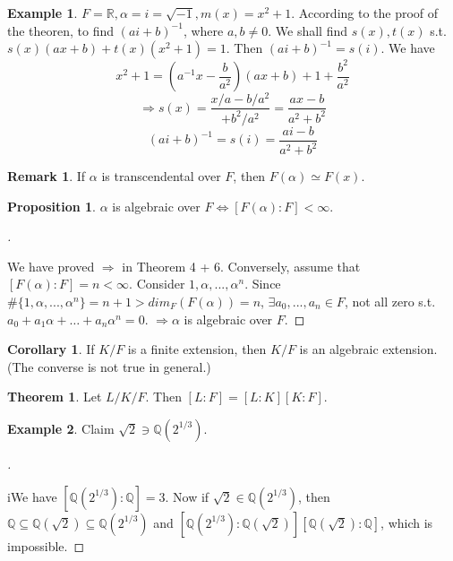 \documentclass{article}
\theoremstyle{definition}
\newtheorem{thm}{Theorem}
\newtheorem{ex}{Example}
\newtheorem{rem}{Remark}
\newtheorem{cor}{Corollary}
\newtheorem{prop}{Proposition}
\newenvironment{proofs}[1][\proofname]{%
  \begin{proof}[#1]$ $\par\nobreak\ignorespaces
}{%
  \end{proof}
}
\begin{document}
\begin{ex}
	$F = \mathbb{R}, \alpha = i = \sqrt{-1}, m(x) = x^2 + 1$.
	According to the proof of the theoren, to find $(ai + b)^{-1}$, where $a, b \neq 0$.
	We shall find $s(x), t(x)$ s.t. $s(x) (ax + b) + t(x) (x^2 + 1) = 1$.
	Then $(ai + b)^{-1} = s(i)$.
	We have
	\[
		x^2 + 1 = (a^{-1} x - \frac{b}{a^2})(ax + b) + 1 + \frac{b^2}{a^2}
	\]
	\[
		\Rightarrow s(x) = \frac{x/a - b/a^2}{ + b^2/a^2} = \frac{ax - b}{a^2 + b^2}
	\]
	\[
		(ai + b)^{-1} = s(i) = \frac{ai - b}{a^2 + b^2}
	\]
\end{ex}

\begin{rem}
	If $\alpha$ is transcendental over $F$, then $F(\alpha) \simeq F(x)$.
\end{rem}

\begin{prop}
	$\alpha$ is algebraic over $F \Leftrightarrow [F(\alpha):F] < \infty$.
\end{prop}

\begin{proofs}
	We have proved $\Rightarrow$ in Theorem 4 + 6.
	Conversely, assume that $[F(\alpha):F] = n < \infty$.
	Consider $1, \alpha, ..., \alpha^n$.
	Since $\#\{1, \alpha, ..., \alpha^n \} = n + 1 > dim_{F}(F(\alpha)) = n$, $\exists a_0, ..., a_n \in F$, not all zero s.t. $a_0 + a_1 \alpha + \hdots + a_n \alpha^n = 0$.
	$\Rightarrow \alpha$ is algebraic over $F$.
\end{proofs}

\begin{cor}
	If $K/F$ is a finite extension, then $K/F$ is an algebraic extension.
	(The converse is not true in general.)
\end{cor}

\begin{thm}
	Let $L/K/F$.
	Then $[L:F] = [L:K][K:F]$.
\end{thm}

\begin{ex}
	Claim $\sqrt{2} \ni \mathbb{Q}(2^{1/3})$.
\end{ex}

\begin{proofs}
	iWe have $[\mathbb{Q}(2^{1/3}) : \mathbb{Q}] = 3$.
	Now if $\sqrt{2} \in \mathbb{Q}(2^{1/3})$, then $\mathbb{Q} \subseteq \mathbb{Q}(\sqrt{2}) \subseteq \mathbb{Q}(2^{1/3})$ and $[\mathbb{Q}(2^{1/3}) : \mathbb{Q}(\sqrt{2})] [\mathbb{Q}(\sqrt{2}) : \mathbb{Q}]$, which is impossible.
\end{proofs}
\end{document}
